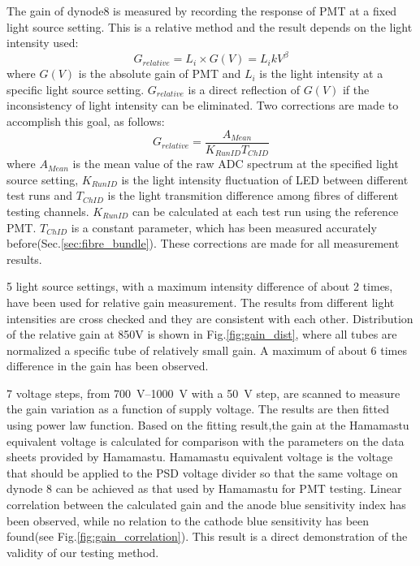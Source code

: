 \documentclass[review,number,sort&compress]{elsarticle}
\begin{document}
The gain of dynode8 is measured by recording the response of PMT at a fixed light source setting. 
This is a relative method and the result depends on the light intensity used:
\begin{equation}
 G_{relative} = L_i \times G(V) = L_i k V^\beta
\end{equation}
where $G(V)$ is the absolute gain of PMT and $L_i$ is the light intensity at a specific light source setting.
$G_{relative}$ is a direct reflection of $G(V)$ if the inconsistency of light intensity can be eliminated.
Two corrections are made to accomplish this goal, as follows: 
\begin{equation}
 G_{relative} = \frac{A_{Mean}}{K_{RunID} T_{ChID}}
\end{equation} 
where $A_{Mean}$ is the mean value of the raw ADC spectrum at the specified light source setting,
$K_{RunID}$ is the light intensity fluctuation of LED between different test runs and $T_{ChID}$ is the light transmition difference among fibres of different testing channels.
$K_{RunID}$ can be calculated at each test run using the reference PMT.
$T_{ChID}$ is a constant parameter, which has been measured accurately before(Sec.\ref{sec:fibre_bundle}).
These corrections are made for all measurement results.

5 light source settings, with a maximum intensity difference of about 2 times, have been used for relative gain measurement.
The results from different light intensities are cross checked and they are consistent with each other.
Distribution of the relative gain at 850V is shown in Fig.\ref{fig:gain_dist}, where all tubes are normalized a specific tube of relatively small gain. 
A maximum of about 6 times difference in the gain has been observed.

7 voltage steps, from \SIrange{700}{1000}{\volt} with a \SI{50}{\volt} step, are scanned to measure the gain variation as a function of supply voltage.
The results are then fitted using power law function.
Based on the fitting result,the gain at the Hamamastu equivalent voltage is calculated for comparison with the parameters on the data sheets provided by Hamamastu.
Hamamastu equivalent voltage is the voltage that should be applied to the PSD voltage divider so that the same voltage on dynode 8 can be achieved as that used by Hamamastu for PMT testing.
Linear correlation between the calculated gain and the anode blue sensitivity index has been observed, while no relation to the cathode blue sensitivity has been found(see Fig.\ref{fig:gain_correlation}).
This result is a direct demonstration of the validity of our testing method.
\end{document}
